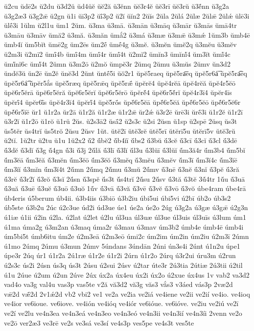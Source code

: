 {ŭ2cu
ŭdē2s
ŭ2du
ŭ3d2ŭ
ŭd4ŭĕ
ŭĕ2ă
ŭ3ĕnn
ŭĕ3r4ĕ
ŭĕ3rī
ŭĕ3rŭ
ŭ3ĕ́nn
ŭ3g2a
ŭ3g2æ3
ŭ3g2ǣ
ŭ2gn
ŭ1i
ŭī3p2
ŭī́3p2
ŭ2ĭ
ŭĭn2
2ŭĭs
2ŭla
2ŭlá
2ŭlæ
2ŭlǣ
2ŭlǽ
ŭlē3i
ŭlḗ3i
1ŭlm
ŭ2l1u
ŭm1
2ŭm.
ŭ3ma
ŭ3mā.
ŭ3mān
ŭ3māq
ŭ3mār
ŭ3mās
ŭmā4tr
ŭ3māu
ŭ3māv
ŭmă2
ŭ3mă.
ŭ3măn
ŭmắ2
ŭ3má
ŭ3mæ
ŭ3mǣ
ŭ3mǽ
1ŭm3b
ŭmb4ē
ŭmb4ĭ
ŭm5bĭt
ŭmē2g
ŭm2ēs
ŭm2ḗ
ŭmḗ4g
ŭ3mĕ.
ŭ3mĕn
ŭmĕ2q
ŭ3mĕu
ŭ3mĕv
ŭ2m3i
ŭ2mī2
ŭmī́4b
ŭmī́4m
ŭmī́4r
ŭmī́4t
ŭ2mĭ2
ŭmĭn3
ŭmĭnĭ́4
ŭm3ĭt
ŭmĭ́4c
ŭmĭ́nĭ6c
ŭmĭ́4t
2ŭmn
ŭ3m2ō
ŭ2mŏ
ŭmpĕ3r
2ŭmq
2ŭmu
ŭ3mŭs
2ŭmv
ŭn3d2
ŭndĕ3ŭ
ŭn2ē
ŭn2ĕ
ŭnĕ3d
2ŭnt
ŭntḗ5i
ŭŏ2r1
ŭpĕ5raeq
ŭpĕ5ra͞eq
ŭpĕ5r6á͞
ŭpĕ5ra͡eq
ŭpĕ5r6á͡
ŭpĕr5ắs
ŭpĕ5ræq
ŭpĕ5rǣq
ŭpĕ5rǣ́
ŭpĕrĕ4
ŭpĕ4rĕā
ŭpĕ4rĕă
ŭpĕ4r5ĕō
ŭpĕ6r5ĕrā
ŭpĕ6r5ĕră
ŭpĕ6r5ĕrĭ
ŭpĕ6r5ĕrō
ŭpĕrĕ́4
ŭpĕ6r5ĕ́rĭ
ŭpĕ4r3ī4
ŭpĕr4īs
ŭpĕrī́4
ŭpĕr6ī́s
ŭpĕ4r3ĭ4
ŭpĕrĭ́4
ŭpĕ5rṓs
ŭpĕ́6r5ĕā
ŭpĕ́6r5ĕă
ŭpĕ́6r5ĕō
ŭpĕ́6r5ĕ6r
ŭpĕ́6r5ĭē
ŭr1
ŭ1r2a
ŭr2ā
ŭ1r2ă
ŭ1r2æ
ŭ1r2ǣ
ŭr2ǽ
ŭ3r2ē
ŭrē3i
ŭrḗ3i
ŭ1r2ĕ
ŭ1r2ī
ŭ3r2ĭ
ŭ1r2ō
ŭ1rŏ
ŭ1rŭ
2ŭs.
ŭ2s3ā2
ŭsā́2
ŭ2s3c
ŭ2si
2ŭsn
ŭ1sp
ŭ2spē
2ŭsq
ŭs3t
ŭs5tĕr
ŭs4trĭ
ŭs5trŏ
2ŭsu
2ŭsv
1ŭt.
ŭtĕ2ī
ŭtĕ3rĕ
ŭtĕ5rī
ŭtĕrī5u
ŭtĕrī5v
ŭtĕ3rŭ
ŭ2tĭ.
1ŭ2tr
ŭ2tu
ŭ1u
1ŭ2x2
ŭ́2
ŭ́bĕ2
ŭ́b4ĭī
ŭ́bs2
ŭ́3bŭ
ŭ́3cĕ
ŭ́3cī
ŭ́3cĭ
ŭ́3cl
ŭ́3dē
ŭ́3dĕ
ŭ́3dĭ
ŭ́3g
ŭ́4gn
ŭ́3i
ŭ́3j
2ŭ́lă
ŭ́3lī
ŭ́3lĭ
ŭ́l3u
ŭ́3lŭī
ŭ́3lŭĭ
ŭ́m3ă4r
ŭ́m3b4
ŭ́m5bĭ
ŭ́m3ĕā
ŭ́m3ĕă
ŭ́3mĕn
ŭ́m3ĕō
ŭ́m3ĕŏ
ŭ́3mĕq
ŭ́3mĕu
ŭ́3mĕv
ŭ́m3ī
ŭ́m3ĭ4c
ŭ́m3ĭē
ŭ́m3ĭĭ
ŭ́3mĭn
ŭ́m3ĭ4t
2ŭ́mn
2ŭ́mq
2ŭ́mu
ŭ́3mŭ
2ŭ́mv
ŭ́3nē
ŭ́3nĕ
ŭ́3nĭ
ŭ́3pĕ
ŭ́3ră
ŭ́3rĕ
ŭ́3r2ĭ
ŭ́3rŏ
ŭ́3sĭ
2ŭ́sn
ŭ́3spĕ
ŭ́s3t
ŭ́s4trĭ
2ŭ́su
2ŭ́sv
ŭ́3tă
ŭ́3tĕ
3ŭ́4tr
1ŭ́u
ŭ́3uā
ŭ́3uă
ŭ́3uē
ŭ́3uĕ
ŭ́3uō
ŭ́3uŏ
1ŭ́v
ŭ́3vā
ŭ́3vă
ŭ́3vē
ŭ́3vĕ
ŭ́3vō
ŭ́3vŏ
úbe4ram
úbe4rā
úb4eris
ú5berum
úb4ii.
ú3b4iis
ú3biō
ú3b2iu
úbi5ui
úbi5vi
ú2bī
úb2o
úb3s2
úb5ste
ú3b2u
2úc
ú2c3ue
úd2i
úd3ue
úe1
úe2a
úe2o
2úg
ú3g2a
ú3gæ
ú3gǣ
ú2g3n
ú1iæ
ú1ii
ú2in
ú2la.
ú2lat
ú2let
ú2lu
úl3ua
úl3uæ
úl3ue
úl3uis
úl3uīs
ú3lum
úm1
ú1ma
úma2g
ú3m2an
ú3maq
úma2r
ú3mau
ú3mav
úm3b2
úmb4e
úmb4ē
úmb4i
úm5bi5t
úmb6itu
úm2e
ú2m3eā
ú2m3eō
úmi2c
úm2im
úm2in
úm2iu
ú2m3ī
2úmn
ú1mo
2úmq
2úmu
ú3mun
2úmv
5úndans
3úndān
2úni
ún3s4i
2únt
ú1n2u
úpe1
úpe3r
2úq
úr1
ú1r2a
2ú1ræ
ú1r2e
ú1r2i
2úrn
ú1r2o
2úrq
ú3r2ui
úru3m
ú2run
ú2s3c
ús2i
2úsn
ús3q
ús3t
2úsu
ú2sui
2úsv
ú2tar
úte3r
2ú3tia
2útiæ
2ú3tii
ú2til
ú1u
2úue
ú2um
ú2un
2úve
2úx
úx2a
úx4eu
úx2i
úx2o
ú2xue
úx4us
1v
vab2
va3d2
vad4o
va3g
val4u
vas3p
vas5te
v2ă
vă3d2
vă3g
văs3
vắs3
v3áed
vás3p
2væ2d
vǣ2d
vǣ́2d
2v1ǽ2d
vb2
vbi2
ve1
ve2a
ve2ia
ve2iá
ve4iene
ve2ii
ve2ií
ve4io.
ve4ioq
ve4ior
ve6ioue.
ve6iove.
ve4ión
ve4ióq
ve4iór
ve6ióue.
ve6ióve.
ve2iu
ve2iú
ve2ī
ve2í
ve2lu
ve4n3ea
ve4n3eá
ve4n3eo
ve4n3eó
ve4n3ii
ve4n3ií
ve4n3íi
2venn
ve2o
ve2ō
ver2æ3
ve3rē
ve2s
ve3sá
ve3sí
ve4s3p
ves5pe
ve4s3t
ves5te
}
